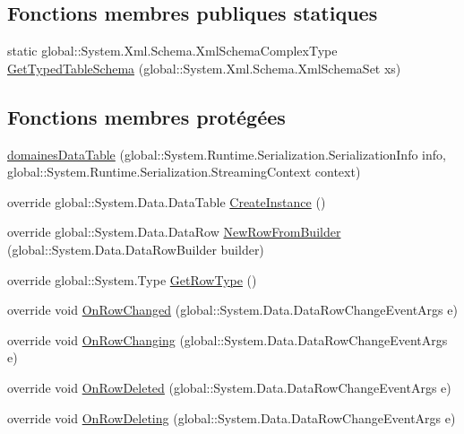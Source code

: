 \subsection*{Fonctions membres publiques statiques}
\begin{DoxyCompactItemize}
\item 
static global\+::\+System.\+Xml.\+Schema.\+Xml\+Schema\+Complex\+Type \hyperlink{classforma_1_1formadb_data_set_1_1domaines_data_table_a47d3a9ae066b4fa13bc7ce190525249b}{Get\+Typed\+Table\+Schema} (global\+::\+System.\+Xml.\+Schema.\+Xml\+Schema\+Set xs)
\end{DoxyCompactItemize}
\subsection*{Fonctions membres protégées}
\begin{DoxyCompactItemize}
\item 
\hyperlink{classforma_1_1formadb_data_set_1_1domaines_data_table_a85f3989a5ca44f8b2b149ed3cf8d734c}{domaines\+Data\+Table} (global\+::\+System.\+Runtime.\+Serialization.\+Serialization\+Info info, global\+::\+System.\+Runtime.\+Serialization.\+Streaming\+Context context)
\item 
override global\+::\+System.\+Data.\+Data\+Table \hyperlink{classforma_1_1formadb_data_set_1_1domaines_data_table_af742509632cae37633975c4775fda882}{Create\+Instance} ()
\item 
override global\+::\+System.\+Data.\+Data\+Row \hyperlink{classforma_1_1formadb_data_set_1_1domaines_data_table_ade69d30c20df10ee2d38878d1c134fa3}{New\+Row\+From\+Builder} (global\+::\+System.\+Data.\+Data\+Row\+Builder builder)
\item 
override global\+::\+System.\+Type \hyperlink{classforma_1_1formadb_data_set_1_1domaines_data_table_a1cbf677c32c5754160c13123d389fbf7}{Get\+Row\+Type} ()
\item 
override void \hyperlink{classforma_1_1formadb_data_set_1_1domaines_data_table_a3c434c041f00ef9b36d52552856ec3b9}{On\+Row\+Changed} (global\+::\+System.\+Data.\+Data\+Row\+Change\+Event\+Args e)
\item 
override void \hyperlink{classforma_1_1formadb_data_set_1_1domaines_data_table_a85a84d5d5847feb2455562a03a452529}{On\+Row\+Changing} (global\+::\+System.\+Data.\+Data\+Row\+Change\+Event\+Args e)
\item 
override void \hyperlink{classforma_1_1formadb_data_set_1_1domaines_data_table_adb9770f67ca4c6b11dd7903ec8344052}{On\+Row\+Deleted} (global\+::\+System.\+Data.\+Data\+Row\+Change\+Event\+Args e)
\item 
override void \hyperlink{classforma_1_1formadb_data_set_1_1domaines_data_table_a8dc61d5bd12f9897de06ffe039e7aaa9}{On\+Row\+Deleting} (global\+::\+System.\+Data.\+Data\+Row\+Change\+Event\+Args e)
\end{DoxyCompactItemize}

